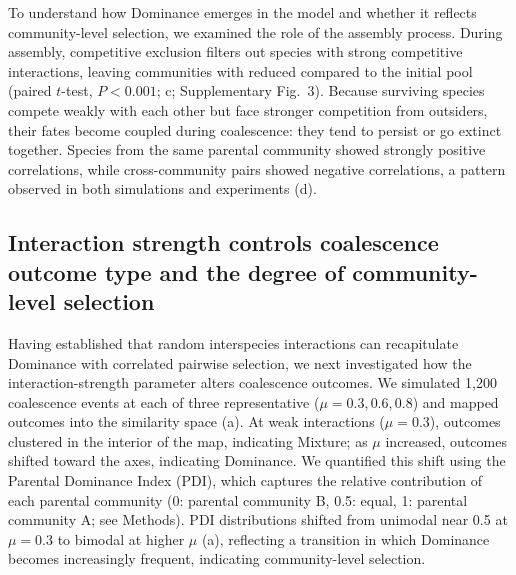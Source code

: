 To understand how Dominance emerges in the model and whether it reflects community-level selection, we examined the role of the assembly process. During assembly, competitive exclusion filters out species with strong competitive interactions, leaving communities with reduced  compared to the initial pool (paired $t$-test, $P <0.001$; c; Supplementary Fig.~3). Because surviving species compete weakly with each other but face stronger competition from outsiders, their fates become coupled during coalescence: they tend to persist or go extinct together.  Species from the same parental community showed strongly positive correlations, while cross-community pairs showed negative correlations, a pattern observed in both simulations and experiments (d). 


\subsection{Interaction strength controls coalescence outcome type and the degree of community-level selection}
\label{sec:results:interaction_strength}

Having established that random interspecies interactions can recapitulate Dominance with correlated pairwise selection, we next investigated how the interaction-strength parameter alters coalescence outcomes. We simulated 1,200 coalescence events at each of three representative  ($\mu = 0.3, 0.6, 0.8$) and mapped outcomes into the similarity space (a). At weak interactions ($\mu = 0.3$), outcomes clustered in the interior of the map, indicating Mixture; as $\mu$ increased, outcomes shifted toward the axes, indicating Dominance. We quantified this shift using the Parental Dominance Index (PDI), which captures the relative contribution of each parental community (0: parental community B, 0.5: equal, 1: parental community A; see Methods). PDI distributions shifted from unimodal near 0.5 at $\mu = 0.3$ to bimodal at higher $\mu$ (a), reflecting a transition in which Dominance becomes increasingly frequent, indicating community-level selection.

